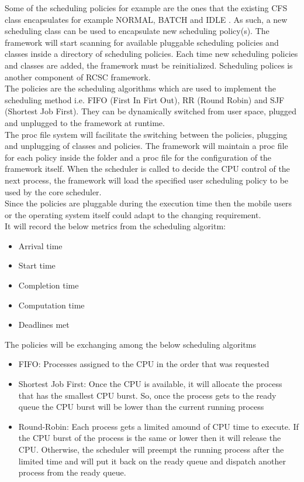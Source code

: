 \documentclass[conference]{IEEEtran}
\begin{document}
Some of the scheduling policies for example are the ones that the existing CFS class encapsulates for example NORMAL, BATCH and IDLE \cite{SchLnx}. 
As such, a new scheduling class can be used to encapsulate new scheduling policy(s). The framework will start scanning for available pluggable scheduling policies  and classes inside a directory of scheduling policies. Each time new scheduling policies and classes are added, the framework must be reinitialized. Scheduling polices is another component of RCSC framework. \\
The policies are the scheduling algorithms which are used to implement the scheduling method i.e. FIFO (First In Firt Out), RR (Round Robin) and SJF (Shortest Job First). They can be dynamically switched from user space, plugged and unplugged to the framework at runtime.  \cite{ALMA01} \\
The proc file system will facilitate the switching between the policies, plugging and unplugging of classes and policies. The framework will maintain a proc file for each policy inside the folder and a proc file for the configuration of the framework itself. When the scheduler is called to decide the CPU control of the next process, the framework will load the specified user scheduling policy to be used by the core scheduler.\\
Since the policies are pluggable during the execution time then the mobile users or the operating system itself could adapt to the changing requirement.\\

It will record the below metrics from the scheduling algoritm:
\begin{itemize}
\item Arrival time
\item Start time
\item Completion time
\item Computation time
\item Deadlines met
\end{itemize}

The policies will be exchanging among the below scheduling algoritms \cite{GITAM01}
\begin{itemize}
\item FIFO: Processes assigned to the CPU in the order that was requested
\item Shortest Job First: Once the CPU is available, it will allocate the process that has the smallest CPU burst. So, once the process gets to the ready queue the CPU burst will be lower than the current running process 
\item Round-Robin: Each process gets a limited amound of CPU time to execute. If the CPU burst of the process is the same or lower then it will release the CPU. Otherwise, the scheduler will preempt the running process after the limited time and will put it back on the ready queue and dispatch another process from the ready queue.
\end{itemize}
\end{document}
